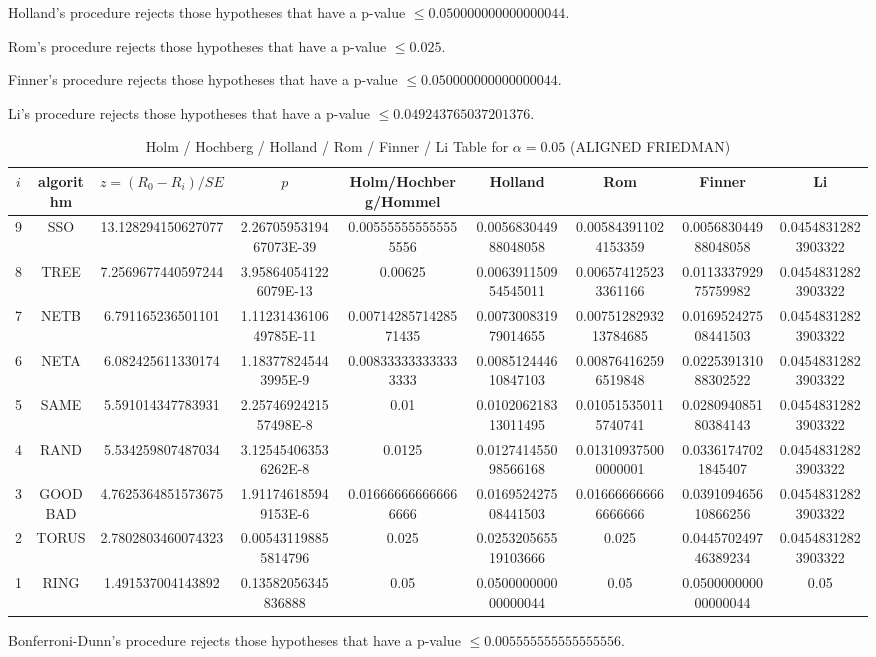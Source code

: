 \documentclass[a4paper,10pt]{article}
\begin{document}
\begin{landscape}
Holland's procedure rejects those hypotheses that have a p-value $\le0.050000000000000044$.


Rom's procedure rejects those hypotheses that have a p-value $\le0.025$.


Finner's procedure rejects those hypotheses that have a p-value $\le0.050000000000000044$.


Li's procedure rejects those hypotheses that have a p-value $\le0.049243765037201376$.



\newpage

\begin{table}[!htp]
\centering\scriptsize
\caption{Holm / Hochberg / Holland / Rom / Finner / Li Table for $\alpha=0.05$ (ALIGNED FRIEDMAN)}
\begin{tabular}{ccccccccc}
$i$&algorithm&$z=(R_0 - R_i)/SE$&$p$&Holm/Hochberg/Hommel&Holland&Rom&Finner&Li\\
\hline
9& SSO&13.128294150627077&2.2670595319467073E-39&0.005555555555555556&0.005683044988048058&0.005843911024153359&0.005683044988048058&0.04548312823903322\\
8& TREE&7.2569677440597244&3.958640541226079E-13&0.00625&0.006391150954545011&0.006574125233361166&0.011333792975759982&0.04548312823903322\\
7& NETB&6.791165236501101&1.1123143610649785E-11&0.0071428571428571435&0.007300831979014655&0.0075128293213784685&0.016952427508441503&0.04548312823903322\\
6& NETA&6.082425611330174&1.183778245443995E-9&0.008333333333333333&0.008512444610847103&0.008764162596519848&0.022539131088302522&0.04548312823903322\\
5& SAME&5.591014347783931&2.2574692421557498E-8&0.01&0.010206218313011495&0.010515350115740741&0.028094085180384143&0.04548312823903322\\
4& RAND&5.534259807487034&3.125454063536262E-8&0.0125&0.012741455098566168&0.013109375000000001&0.03361747021845407&0.04548312823903322\\
3& GOODBAD&4.7625364851573675&1.911746185949153E-6&0.016666666666666666&0.016952427508441503&0.016666666666666666&0.039109465610866256&0.04548312823903322\\
2& TORUS&2.7802803460074323&0.005431198855814796&0.025&0.025320565519103666&0.025&0.044570249746389234&0.04548312823903322\\
1& RING&1.491537004143892&0.13582056345836888&0.05&0.050000000000000044&0.05&0.050000000000000044&0.05\\
\hline
\end{tabular}
\end{table}
Bonferroni-Dunn's procedure rejects those hypotheses that have a p-value $\le0.005555555555555556$.



\end{landscape}
\end{document}

